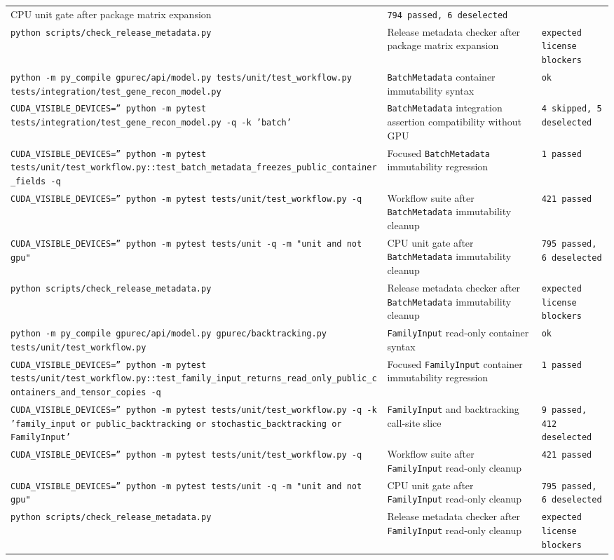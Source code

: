 \documentclass[11pt]{article}
\begin{document}
\begin{center}
\begin{tabular}{lll}
CPU unit gate after package matrix expansion &
\texttt{794 passed, 6 deselected} \\
\texttt{python scripts/check\_release\_metadata.py} &
Release metadata checker after package matrix expansion &
\texttt{expected license blockers} \\
\texttt{python -m py\_compile gpurec/api/model.py tests/unit/test\_workflow.py tests/integration/test\_gene\_recon\_model.py} &
\texttt{BatchMetadata} container immutability syntax &
\texttt{ok} \\
\texttt{CUDA\_VISIBLE\_DEVICES='' python -m pytest tests/integration/test\_gene\_recon\_model.py -q -k 'batch'} &
\texttt{BatchMetadata} integration assertion compatibility without GPU &
\texttt{4 skipped, 5 deselected} \\
\texttt{CUDA\_VISIBLE\_DEVICES='' python -m pytest tests/unit/test\_workflow.py::test\_batch\_metadata\_freezes\_public\_container\_fields -q} &
Focused \texttt{BatchMetadata} immutability regression &
\texttt{1 passed} \\
\texttt{CUDA\_VISIBLE\_DEVICES='' python -m pytest tests/unit/test\_workflow.py -q} &
Workflow suite after \texttt{BatchMetadata} immutability cleanup &
\texttt{421 passed} \\
\texttt{CUDA\_VISIBLE\_DEVICES='' python -m pytest tests/unit -q -m "unit and not gpu"} &
CPU unit gate after \texttt{BatchMetadata} immutability cleanup &
\texttt{795 passed, 6 deselected} \\
\texttt{python scripts/check\_release\_metadata.py} &
Release metadata checker after \texttt{BatchMetadata} immutability cleanup &
\texttt{expected license blockers} \\
\texttt{python -m py\_compile gpurec/api/model.py gpurec/backtracking.py tests/unit/test\_workflow.py} &
\texttt{FamilyInput} read-only container syntax &
\texttt{ok} \\
\texttt{CUDA\_VISIBLE\_DEVICES='' python -m pytest tests/unit/test\_workflow.py::test\_family\_input\_returns\_read\_only\_public\_containers\_and\_tensor\_copies -q} &
Focused \texttt{FamilyInput} container immutability regression &
\texttt{1 passed} \\
\texttt{CUDA\_VISIBLE\_DEVICES='' python -m pytest tests/unit/test\_workflow.py -q -k 'family\_input or public\_backtracking or stochastic\_backtracking or FamilyInput'} &
\texttt{FamilyInput} and backtracking call-site slice &
\texttt{9 passed, 412 deselected} \\
\texttt{CUDA\_VISIBLE\_DEVICES='' python -m pytest tests/unit/test\_workflow.py -q} &
Workflow suite after \texttt{FamilyInput} read-only cleanup &
\texttt{421 passed} \\
\texttt{CUDA\_VISIBLE\_DEVICES='' python -m pytest tests/unit -q -m "unit and not gpu"} &
CPU unit gate after \texttt{FamilyInput} read-only cleanup &
\texttt{795 passed, 6 deselected} \\
\texttt{python scripts/check\_release\_metadata.py} &
Release metadata checker after \texttt{FamilyInput} read-only cleanup &
\texttt{expected license blockers} \\
\bottomrule
\end{tabular}
\end{center}
\end{document}
